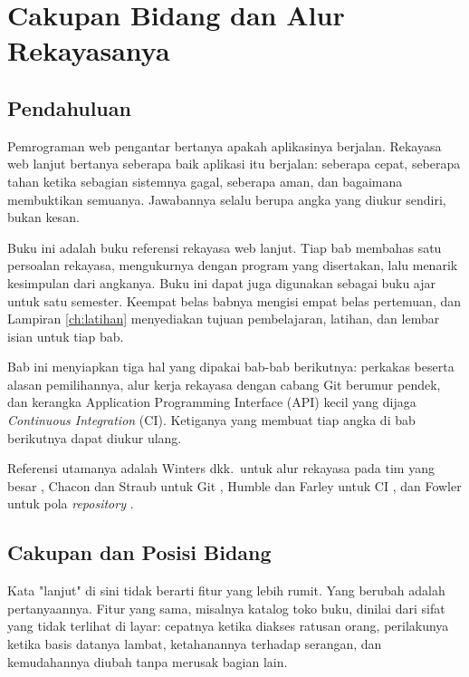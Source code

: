 \chapter{Cakupan Bidang dan Alur Rekayasanya}
\label{ch:overview}

\section{Pendahuluan}

Pemrograman web pengantar bertanya apakah aplikasinya berjalan. Rekayasa web
lanjut bertanya seberapa baik aplikasi itu berjalan: seberapa cepat, seberapa
tahan ketika sebagian sistemnya gagal, seberapa aman, dan bagaimana
membuktikan semuanya. Jawabannya selalu berupa angka yang diukur sendiri,
bukan kesan.

Buku ini adalah buku referensi rekayasa web lanjut. Tiap bab membahas satu
persoalan rekayasa, mengukurnya dengan program yang disertakan, lalu menarik
kesimpulan dari angkanya. Buku ini dapat juga digunakan sebagai buku ajar
untuk satu semester. Keempat belas babnya mengisi empat belas pertemuan, dan
Lampiran \ref{ch:latihan} menyediakan tujuan pembelajaran, latihan, dan
lembar isian untuk tiap bab.

Bab ini menyiapkan tiga hal yang dipakai bab-bab berikutnya: perkakas beserta
alasan pemilihannya, alur kerja rekayasa dengan cabang Git berumur pendek, dan
kerangka Application Programming Interface (API) kecil yang dijaga
\textit{Continuous Integration} (CI). Ketiganya yang membuat tiap angka di
bab berikutnya dapat diukur ulang.

Referensi utamanya adalah Winters dkk.\ untuk alur rekayasa pada tim yang
besar \cite{winters2020swe}, Chacon dan Straub untuk Git
\cite{chacon2014progit}, Humble dan Farley untuk CI \cite{humble2010cd}, dan
Fowler untuk pola \textit{repository} \cite{fowler2002poeaa}.

\section{Cakupan dan Posisi Bidang}

Kata "lanjut" di sini tidak berarti fitur yang lebih rumit. Yang
berubah adalah pertanyaannya. Fitur yang sama, misalnya katalog toko buku,
dinilai dari sifat yang tidak terlihat di layar: cepatnya ketika diakses
ratusan orang, perilakunya ketika basis datanya lambat, ketahanannya terhadap
serangan, dan kemudahannya diubah tanpa merusak bagian lain.

